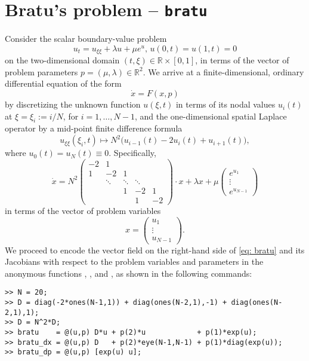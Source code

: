 \section{Bratu's problem -- \texttt{bratu}}
Consider the scalar boundary-value problem
\begin{equation}
u_t=u_{\xi\xi}+\lambda u+\mu e^u,\,u(0,t)=u(1,t)=0
\end{equation}
on the two-dimensional domain $(t,\xi)\in\mathbb{R}\times[0,1]$, in terms of the vector of problem parameters $p=(\mu,\lambda)\in\mathbb{R}^2$. We arrive at a finite-dimensional, ordinary differential equation of the form
\begin{equation}
\dot{x}=F(x,p)
\end{equation}
by discretizing the unknown function $u(\xi,t)$ in terms of its nodal values $u_i(t)$ at $\xi=\xi_i:=i/N$, for $i=1,\ldots,N-1$, and the one-dimensional spatial Laplace operator by a mid-point finite difference formula
\begin{equation}
u_{\xi\xi}(\xi_i,t)\mapsto N^2\big(u_{i-1}(t)-2u_i(t)+u_{i+1}(t)\big),
\end{equation}
where $u_0(t)=u_N(t)\equiv 0$. Specifically,
\begin{equation}
\dot{x}=N^2\left(\begin{array}{rrrrr}-2 & 1 & & &\\1 & -2 & 1 & &\\& \ddots & \ddots & \ddots &\\& & 1 & -2 & 1\\& & & 1 & -2\end{array}\right)\cdot x+\lambda x+\mu \left(\begin{array}{c}e^{u_1}\\\vdots\\e^{u_{N-1}}\end{array}\right)
\label{eq: bratu}
\end{equation}
in terms of the vector of problem variables
\begin{equation}
x=\left(\begin{array}{c}u_1\\\vdots\\u_{N-1}\end{array}\right).
\end{equation}
We proceed to encode the vector field on the right-hand side of \eqref{eq: bratu} and its Jacobians with respect to the problem variables and parameters in the anonymous functions , , and , as shown in the following commands:
\begin{lstlisting}[language=coco-highlight]
>> N = 20;
>> D = diag(-2*ones(N-1,1)) + diag(ones(N-2,1),-1) + diag(ones(N-2,1),1);
>> D = N^2*D;
>> bratu    = @(u,p) D*u + p(2)*u            + p(1)*exp(u);
>> bratu_dx = @(u,p) D   + p(2)*eye(N-1,N-1) + p(1)*diag(exp(u));
>> bratu_dp = @(u,p) [exp(u) u];
\end{lstlisting}

